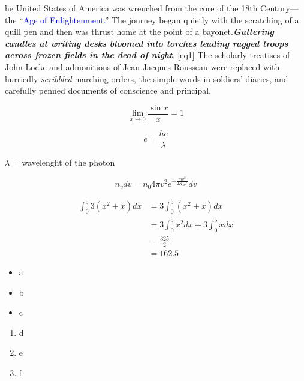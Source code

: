 \documentclass{report}
\begin{document}
he United States of America was wrenched from the core of the 18th Century—the “\textcolor{blue}{Age of Enlightenment.}” The journey began quietly with the scratching of a quill pen and then was thrust home at the
point of a bayonet.\textbf{\textit{Guttering candles at writing desks bloomed into torches leading ragged troops across
		frozen fields in the dead of night}}. \cite{daryaee2014sasanian} \autoref{eq1} The scholarly treatises of John Locke and admonitions of Jean-Jacques
Rousseau were \underline{replaced} with hurriedly \textit{scribbled} marching orders, the simple words in soldiers’ diaries, and
carefully penned documents of conscience and principal. \cite{art1}

\begin{equation}
	\lim_{x \to 0} \frac{\sin x}{x} = 1
\end{equation}

\begin{equation}
	e = \frac{hc}{\lambda}
\end{equation}

$\lambda$ = wavelenght of the photon

\begin{equation} \label{eq1}
	n_vdv = n_0 4\pi v^2 e^{-\frac{mv^2}{2K_BT}} dv 
\end{equation}

\begin{align}
	\int_{0}^{5} 3(x^2+x)dx & = 3\int_{0}^{5} (x^2+x)dx \\ & = 3\int_{0}^{5}x^2dx + 3\int_{0}^{5} xdx \\ & = \frac{325}{2} \\ & = 162.5
\end{align}

\begin{itemize}
	\item a
	\item b
	\item c

\end{itemize}

\begin{enumerate}
	\item d
	\item e
	\item f
\end{enumerate}




	
\end{document}
